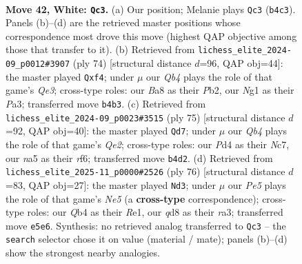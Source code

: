 \documentclass[11pt]{article}
\begin{document}
\clearpage

\begin{figure}[p]\centering
\begin{subfigure}{0.46\textwidth}\centering
\resizebox{\linewidth}{!}{%
\newchessgame
\chessboard[
  setfen={B2qn3/3b2k1/pr6/n3Pp1p/PQ1P2p1/N7/5PPP/R3K1N1 w - - 6 42},
  showmover=false,
  pgfstyle=straightmove, color=movearrow, markmove={b4-c3}
]}
\caption{}
\end{subfigure}\hfill
\begin{subfigure}{0.46\textwidth}\centering
\resizebox{\linewidth}{!}{%
\newchessgame
\chessboard[
  setfen={5rk1/1b4p1/1p2p2p/p2p4/3Nnq2/P1PBQ2P/1P4P1/2R3K1 w - - 0 38},
  showmover=false,
  pgfstyle=straightmove, color=movearrow, markmove={e3-f4}
]}
\caption{}
\end{subfigure}
\\[4pt]
\begin{subfigure}{0.46\textwidth}\centering
\resizebox{\linewidth}{!}{%
\newchessgame
\chessboard[
  setfen={4k1r1/1pn1qp2/2p2R1Q/p2pPN2/3P4/PP1B4/2P4K/8 b - - 1 38},
  showmover=false,
  pgfstyle=straightmove, color=movearrow, markmove={e7-d7}
]}
\caption{}
\end{subfigure}\hfill
\begin{subfigure}{0.46\textwidth}\centering
\resizebox{\linewidth}{!}{%
\newchessgame
\chessboard[
  setfen={6k1/4bpp1/2p5/q2pNPn1/3B2Qp/rP5P/6P1/4R1K1 w - - 6 39},
  showmover=false,
  pgfstyle=straightmove, color=movearrow, markmove={e5-d3}
]}
\caption{}
\end{subfigure}
\caption{\textbf{Move 42, White: \texttt{Qc3}.} (a) Our position; Melanie plays \texttt{Qc3} (\texttt{b4c3}). Panels (b)--(d) are the retrieved master positions whose correspondence most drove this move (highest QAP objective among those that transfer to it). (b) Retrieved from \texttt{lichess\_elite\_2024-09\_p0012\#3907} (ply 74) [structural distance $d$=96, QAP obj=44]: the master played \texttt{Qxf4}; under $\mu$ our \emph{Qb4} plays the role of that game's \emph{Qe3}; cross-type roles: our \emph{B}a8 as their \emph{P}b2, our \emph{N}g1 as their \emph{P}a3; transferred move \texttt{b4b3}. (c) Retrieved from \texttt{lichess\_elite\_2024-09\_p0023\#3515} (ply 75) [structural distance $d$=92, QAP obj=40]: the master played \texttt{Qd7}; under $\mu$ our \emph{Qb4} plays the role of that game's \emph{Qe2}; cross-type roles: our \emph{P}d4 as their \emph{N}c7, our \emph{n}a5 as their \emph{r}f6; transferred move \texttt{b4d2}. (d) Retrieved from \texttt{lichess\_elite\_2025-11\_p0000\#2526} (ply 76) [structural distance $d$=83, QAP obj=27]: the master played \texttt{Nd3}; under $\mu$ our \emph{Pe5} plays the role of that game's \emph{Ne5} (a \textbf{cross-type} correspondence); cross-type roles: our \emph{Q}b4 as their \emph{R}e1, our \emph{q}d8 as their \emph{r}a3; transferred move \texttt{e5e6}. Synthesis: no retrieved analog transferred to \texttt{Qc3} -- the \texttt{search} selector chose it on value (material / mate); panels (b)--(d) show the strongest nearby analogies.}
\label{fig:thought-m82}
\end{figure}
\end{document}
